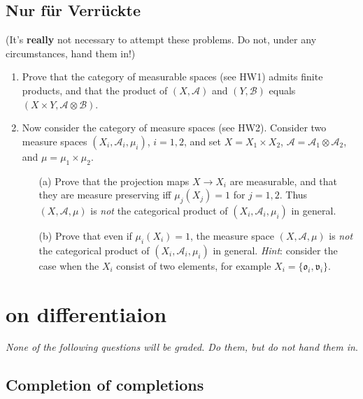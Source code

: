 \documentclass[lang=cn,11pt]{elegantbook}
\begin{document}
\section*{Nur f\"ur Verr\"uckte}
(It's \textbf{really} not necessary to attempt these problems. Do not, under any circumstances, hand them in!)
\begin{enumerate}
\item Prove that the category of measurable spaces (see HW1) admits finite products, and that the product of $(X,\mathcal{A})$ and $(Y,\mathcal{B})$ equals $(X\times Y,\mathcal{A}\otimes\mathcal{B})$. 
\item Now consider the category of measure spaces (see HW2). Consider two 
  measure spaces $(X_i,\mathcal{A}_i,\mu_i)$, $i=1,2$, and set $X=X_1\times X_2$, $\mathcal{A}=\mathcal{A}_1\otimes \mathcal{A}_2$, and $\mu=\mu_1\times\mu_2$.
  \begin{itemize}
  \item[(a)]Prove that the projection maps $X\to X_i$ are measurable, and that they are measure preserving iff $\mu_j(X_j)=1$ for $j=1,2$. Thus $(X,\mathcal{A},\mu)$ is \emph{not} the categorical product of $(X_i,\mathcal{A}_i,\mu_i)$ in general.
  \item[(b)]Prove that even if $\mu_i(X_i)=1$, the measure space $(X,\mathcal{A},\mu)$ is \emph{not} the categorical product of $(X_i,\mathcal{A}_i,\mu_i)$ in general.
    \textit{Hint}: consider the case when the $X_i$ consist of two elements, for example $X_i=\{\mathfrak{o}_i,\mathfrak{v}_i\}$.
  \end{itemize}
\end{enumerate}












\chapter{on differentiaion}

\begin{center}
\textit{None of the following questions will be graded. Do them, but do not hand them in}.
\end{center}

\section{Completion of completions}
\end{document}
